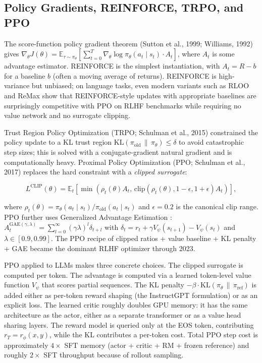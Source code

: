 \documentclass{article}
\begin{document}
\subsection{Policy Gradients, REINFORCE, TRPO, and PPO}\label{policy-gradients-reinforce-trpo-and-ppo}

The score-function policy gradient theorem (Sutton et al., 1999; Williams, 1992) gives \(\nabla_\theta J(\theta) = \mathbb{E}_{\tau \sim \pi_\theta} \left[ \sum_{t=0}^{T} \nabla_\theta \log \pi_\theta(a_t \mid s_t) \cdot A_t \right]\), where \(A_t\) is some advantage estimator. REINFORCE is the simplest instantiation, with \(A_t = R - b\) for a baseline \(b\) (often a moving average of returns). REINFORCE is high-variance but unbiased; on language tasks, even modern variants such as RLOO \citep{ahmadian2024backtobasicsrevisi} and ReMax show that REINFORCE-style updates with appropriate baselines are surprisingly competitive with PPO on RLHF benchmarks while requiring no value network and no surrogate clipping.

Trust Region Policy Optimization (TRPO; Schulman et al., 2015) constrained the policy update to a KL trust region \(\mathrm{KL}(\pi_{\text{old}} \,\|\, \pi_\theta) \le \delta\) to avoid catastrophic step sizes; this is solved with a conjugate-gradient natural gradient and is computationally heavy. Proximal Policy Optimization (PPO; Schulman et al., 2017) replaces the hard constraint with a \emph{clipped surrogate}:

\[L^{\mathrm{CLIP}}(\theta) = \mathbb{E}_t \left[ \min\left(\rho_t(\theta) A_t, \, \mathrm{clip}(\rho_t(\theta), 1-\epsilon, 1+\epsilon) A_t \right) \right],\]

where \(\rho_t(\theta) = \pi_\theta(a_t \mid s_t)/\pi_{\text{old}}(a_t \mid s_t)\) and \(\epsilon = 0.2\) is the canonical clip range. PPO further uses Generalized Advantage Estimation \citep{schulman2016highdimensionalcon}: \(A_t^{\mathrm{GAE}(\gamma, \lambda)} = \sum_{l=0}^{\infty} (\gamma \lambda)^l \delta_{t+l}\) with \(\delta_t = r_t + \gamma V_\psi(s_{t+1}) - V_\psi(s_t)\) and \(\lambda \in [0.9, 0.99]\). The PPO recipe of clipped ratios + value baseline + KL penalty + GAE became the dominant RLHF optimizer through 2023.

PPO applied to LLMs makes three concrete choices. The clipped surrogate is computed per token. The advantage is computed via a learned token-level value function \(V_\psi\) that scores partial sequences. The KL penalty \(-\beta \cdot \mathrm{KL}(\pi_\theta \,\|\, \pi_{\text{ref}})\) is added either as per-token reward shaping (the InstructGPT formulation) or as an explicit loss. The learned critic roughly doubles GPU memory: it has the same architecture as the actor, either as a separate transformer or as a value head sharing layers. The reward model is queried only at the EOS token, contributing \(r_T = r_\phi(x, y)\), while the KL contributes a per-token cost. Total PPO step cost is approximately \(4\times\) SFT memory (actor + critic + RM + frozen reference) and roughly \(2\times\) SFT throughput because of rollout sampling.
\end{document}
